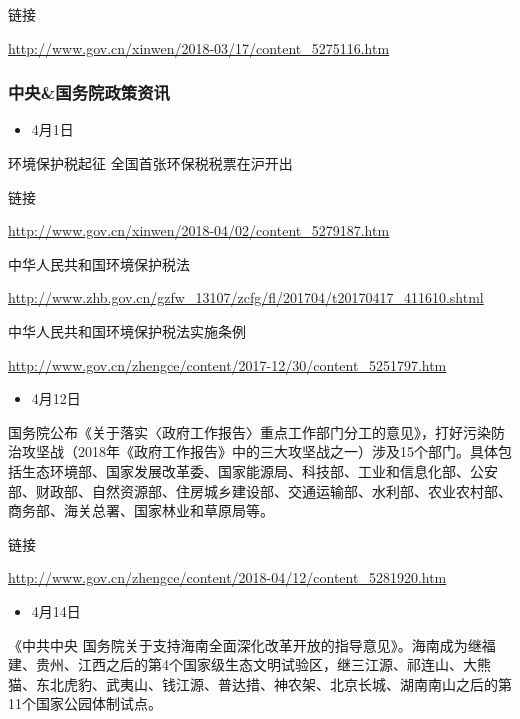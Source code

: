 \documentclass[
]{book}
\providecommand{\tightlist}{%
  \setlength{\itemsep}{0pt}\setlength{\parskip}{0pt}}
\begin{document}
链接

\url{http://www.gov.cn/xinwen/2018-03/17/content_5275116.htm}

\hypertarget{ux4e2dux592eux56fdux52a1ux9662ux653fux7b56ux8d44ux8baf}{%
\subsubsection*{中央\&国务院政策资讯}\label{ux4e2dux592eux56fdux52a1ux9662ux653fux7b56ux8d44ux8baf}}

\begin{itemize}
\tightlist
\item
  4月1日
\end{itemize}

环境保护税起征 全国首张环保税税票在沪开出

链接

\url{http://www.gov.cn/xinwen/2018-04/02/content_5279187.htm}

中华人民共和国环境保护税法

\url{http://www.zhb.gov.cn/gzfw_13107/zcfg/fl/201704/t20170417_411610.shtml}

中华人民共和国环境保护税法实施条例

\url{http://www.gov.cn/zhengce/content/2017-12/30/content_5251797.htm}

\begin{itemize}
\tightlist
\item
  4月12日
\end{itemize}

国务院公布《关于落实〈政府工作报告〉重点工作部门分工的意见》，打好污染防治攻坚战（2018年《政府工作报告》中的三大攻坚战之一）涉及15个部门。具体包括生态环境部、国家发展改革委、国家能源局、科技部、工业和信息化部、公安部、财政部、自然资源部、住房城乡建设部、交通运输部、水利部、农业农村部、商务部、海关总署、国家林业和草原局等。

链接

\url{http://www.gov.cn/zhengce/content/2018-04/12/content_5281920.htm}

\begin{itemize}
\tightlist
\item
  4月14日
\end{itemize}

《中共中央 国务院关于支持海南全面深化改革开放的指导意见》。海南成为继福建、贵州、江西之后的第4个国家级生态文明试验区，继三江源、祁连山、大熊猫、东北虎豹、武夷山、钱江源、普达措、神农架、北京长城、湖南南山之后的第11个国家公园体制试点。
\end{document}
